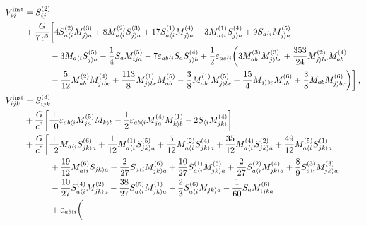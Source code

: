 \documentclass[prd,preprint,superscriptaddress,tightenlines,nofootinbib,
  eqsecnum,showpacs]{revtex4}
\begin{document}
\begin{subequations}
\begin{align}
  V_{ij}^\text{inst} &= S^{(2)}_{ij} \nonumber \\ & +
  {G\over7\,c^{5}}\bigg[4S^{(2)}_{a\langle i}M^{(3)}_{j\rangle
      a}+8M^{(2)}_{a\langle i}S^{(3)}_{j\rangle a}
    +17S^{(1)}_{a\langle i}M^{(4)}_{j\rangle a}-3M^{(1)}_{a\langle
      i}S^{(4)}_{j\rangle a}+9S_{a\langle i}M^{(5)}_{j\rangle
      a}\nonumber\\ & \quad\qquad -3M_{a\langle i}S^{(5)}_{j\rangle
      a}-{1\over4}S_{a}M^{(5)}_{ija}-7\varepsilon_{ab\langle
      i}S_{a}S^{(4)}_{j\rangle b} +{1\over2}\varepsilon_{ac\langle
      i}\bigg(3M^{(3)}_{ab}M^{(3)}_{j\rangle bc}
    +{353\over24}M^{(2)}_{j\rangle bc}M^{(4)}_{ab}\nonumber\\ &
    \quad\qquad -{5\over12}M^{(2)}_{ab}M^{(4)}_{j\rangle
      bc}+{113\over8}M^{(1)}_{j\rangle bc}M^{(5)}_{ab}
    -{3\over8}M^{(1)}_{ab}M^{(5)}_{j\rangle bc}+{15\over4}M_{j\rangle
      bc}M^{(6)}_{ab} +{3\over8}M_{ab}M^{(6)}_{j\rangle
      bc}\bigg)\bigg]\,,\\
V_{ijk}^\text{inst} &= S^{(3)}_{ijk} \nonumber \\ &+ {G\over c^3}
\bigg[ {1\over10}\varepsilon_{ab\langle i}M^{(5)}_{ja}M_{k\rangle b}-
  {1\over2}\varepsilon_{ab\langle i}M^{(4)}_{ja}M^{(1)}_{k\rangle b} -
  2 S_{\langle i}M^{(4)}_{jk\rangle } \bigg] \nonumber \\ &+
\frac{G}{c^5} \bigg[ \frac{1}{12} M_{a \langle i} S_{jk \rangle
    a}^{(6)} + \frac{1}{12} M_{a \langle i}^{(1)} S_{jk \rangle
    a}^{(5)} + \frac{5}{12} M_{a \langle i}^{(2)} S_{jk \rangle
    a}^{(4)} + \frac{35}{12} M_{a \langle i}^{(4)} S_{jk \rangle
    a}^{(2)} + \frac{49}{12} M_{a \langle i}^{(5)} S_{jk \rangle
    a}^{(1)} \nonumber \\ & \quad\qquad + \frac{19}{12} M_{a \langle
    i}^{(6)} S_{jk \rangle a} + \frac{2}{27} S_{a \langle i} M_{jk
    \rangle a}^{(6)} + \frac{10}{27} S_{a \langle i}^{(1)} M_{jk
    \rangle a}^{(5)} + \frac{2}{27} S_{a \langle i}^{(2)} M_{jk
    \rangle a}^{(4)} + \frac{8}{9} S_{a \langle i}^{(3)} M_{jk \rangle
    a}^{(3)} \nonumber \\ & \quad\qquad - \frac{10}{27} S_{a \langle
    i}^{(4)} M_{jk \rangle a}^{(2)} - \frac{38}{27} S_{a \langle
    i}^{(5)} M_{jk \rangle a}^{(1)} - \frac{2}{3} S_{a \langle
    i}^{(6)} M_{jk \rangle a} - \frac{1}{60} S_a M_{ijka}^{(6)}
  \nonumber \\ & \quad\qquad + \varepsilon_{ab \langle i} \bigg(-

\end{align}
\end{subequations}
\end{document}
